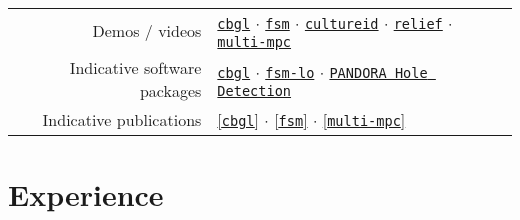 \documentclass[a4paper,10pt,twoside]{article}
\begin{document}
\vspace{+0.1cm}
\begin{tabular}{rl}

  Demos / videos & \href{https://www.youtube.com/watch?v=xaDKjI0WkDc}{\texttt{cbgl}} $\cdot$ \href{https://www.youtube.com/watch?v=hB4qsHCEXGI}{\texttt{fsm}} $\cdot$ \href{https://cultureid.web.auth.gr/?page\_id=200&lang=en}{\texttt{cultureid}} $\cdot$ \href{https://relief.web.auth.gr/}{\texttt{relief}} $\cdot$ \href{https://www.youtube.com/watch?v=937OZez1iN8}{\texttt{multi-mpc}} \\

  Indicative software packages &
  \href{https://github.com/li9i/cbgl}{\texttt{cbgl}} $\cdot$
  \href{https://github.com/li9i/fsm-lo}{\texttt{fsm-lo}} $\cdot$
  \href{https://github.com/li9i/pandora\_vision\_2014/tree/hydro-devel/pandora\_vision\_hole\_detector}{\texttt{PANDORA Hole Detection}} \\

  Indicative publications &
  \href{https://ieeexplore.ieee.org/abstract/document/10802235}{[\texttt{cbgl}]} $\cdot$
  \href{https://ieeexplore.ieee.org/abstract/document/9981228}{[\texttt{fsm}]} $\cdot$
  \href{https://www.tandfonline.com/doi/full/10.1080/00207179.2018.1514129}{[\texttt{multi-mpc}]}

\end{tabular}

\section{\textbf{Experience}}
\end{document}
